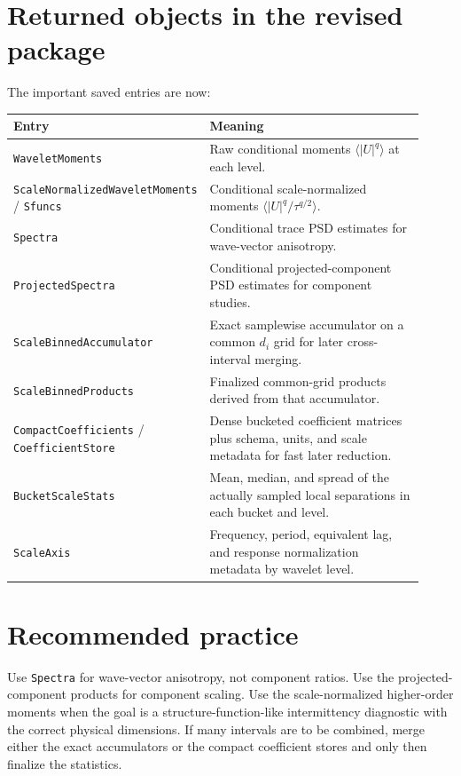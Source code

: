 \documentclass[11pt]{article}
\begin{document}
\section{Returned objects in the revised package}

The important saved entries are now:
\begin{longtable}{p{0.28\linewidth} p{0.64\linewidth}}
\toprule
Entry & Meaning \\
\midrule
\texttt{WaveletMoments} & Raw conditional moments $\langle |U|^q\rangle$ at each level. \\
\texttt{ScaleNormalizedWaveletMoments} / \texttt{Sfuncs} & Conditional scale-normalized moments $\langle |U|^q / \tau^{q/2}\rangle$. \\
\texttt{Spectra} & Conditional trace PSD estimates for wave-vector anisotropy. \\
\texttt{ProjectedSpectra} & Conditional projected-component PSD estimates for component studies. \\
\texttt{ScaleBinnedAccumulator} & Exact samplewise accumulator on a common $d_i$ grid for later cross-interval merging. \\
\texttt{ScaleBinnedProducts} & Finalized common-grid products derived from that accumulator. \\
\texttt{CompactCoefficients} / \texttt{CoefficientStore} & Dense bucketed coefficient matrices plus schema, units, and scale metadata for fast later reduction. \\
\texttt{BucketScaleStats} & Mean, median, and spread of the actually sampled local separations in each bucket and level. \\
\texttt{ScaleAxis} & Frequency, period, equivalent lag, and response normalization metadata by wavelet level. \\
\bottomrule
\end{longtable}

\section{Recommended practice}

Use \texttt{Spectra} for wave-vector anisotropy, not component ratios. Use the projected-component products for component scaling. Use the scale-normalized higher-order moments when the goal is a structure-function-like intermittency diagnostic with the correct physical dimensions. If many intervals are to be combined, merge either the exact accumulators or the compact coefficient stores and only then finalize the statistics.
\end{document}
